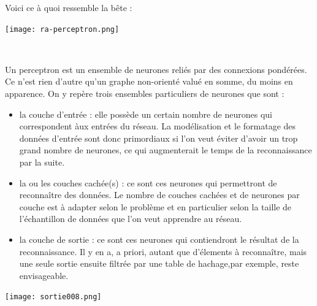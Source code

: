 \documentclass[a4paper,12pt]{report}
\begin{document}
Voici ce \`a quoi ressemble la b\^ete :
\begin{center}
	
	\texttt{[image: ra-perceptron.png]}\\
	\caption{\emph{Perceptron \`a une couche cach\'ee}}\\
\end{center}

Un perceptron est un ensemble de neurones reli\'es par des connexions
pond\'er\'ees. Ce n'est rien d'autre qu'un graphe non-orient\'e valu\'e
en somme, du moins en apparence. On y rep\`ere trois ensembles
particuliers de neurones que sont : 
\begin{itemize}
	\item la couche d'entr\'ee : elle poss\`ede un certain nombre de neurones qui
correspondent \`aux entr\'ees du r\'eseau. La mod\'elisation et le
formatage des donn\'ees d'entr\'ee sont donc primordiaux si l'on veut
\'eviter d'avoir un trop grand nombre de neurones, ce qui augmenterait
le temps de la reconnaissance par la suite.


\item la ou les couches cach\'ee(s) : ce sont ces neurones qui permettront de
reconna\^itre des donn\'ees. Le nombre de couches cach\'ees et de
neurones par couche est \`a adapter selon le probl\`eme et en
particulier selon la taille de l'\'echantillon de donn\'ees que l'on veut
apprendre au r\'eseau.


\item la couche de sortie : ce sont ces neurones qui contiendront le
r\'esultat de la reconnaissance. Il y en a, a priori, autant que
d'\'elements \`a reconna\^itre, mais une seule sortie ensuite filtr\'ee
par une table de hachage,par exemple, reste envisageable.


\end{itemize}


\begin{center}
	
	\texttt{[image: sortie008.png]}\\
	\caption{\emph{Perceptron \`a une sortie}}\\
\end{center}




\end{document}
